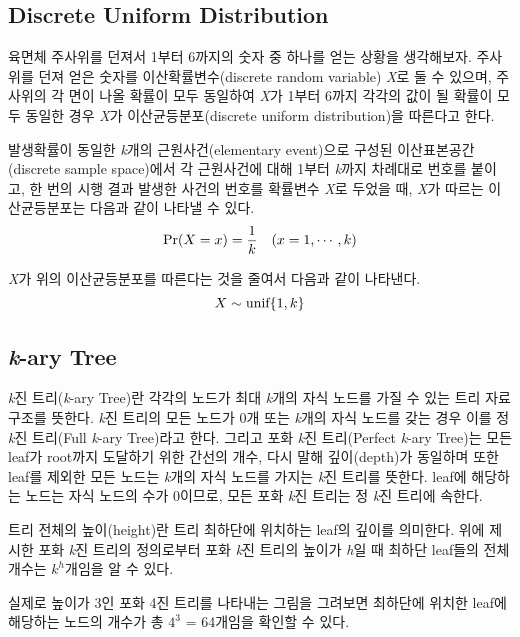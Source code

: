 \documentclass[11pt]{article}
\begin{document}
\subsection{Discrete Uniform Distribution}
육면체 주사위를 던져서 1부터 6까지의 숫자 중 하나를 얻는 상황을 생각해보자. 주사위를 던져 얻은 숫자를 이산확률변수(discrete random variable) \textit{X}로 둘 수 있으며, 주사위의 각 면이 나올 확률이 모두 동일하여 \textit{X}가 1부터 6까지 각각의 값이 될 확률이 모두 동일한 경우 \textit{X}가 이산균등분포(discrete uniform distribution)을 따른다고 한다.

발생확률이 동일한 \textit{k}개의 근원사건(elementary event)으로 구성된 이산표본공간(discrete sample space)에서 각 근원사건에 대해 1부터 \textit{k}까지 차례대로 번호를 붙이고, 한 번의 시행 결과 발생한 사건의 번호를 확률변수 \textit{X}로 두었을 때, \textit{X}가 따르는 이산균등분포는 다음과 같이 나타낼 수 있다.
\[\textnormal{Pr}(X = x) = \frac{1}{k} \quad(x = 1,\cdots, k)\]

\singlespacing \noindent \textit{X}가 위의 이산균등분포를 따른다는 것을 줄여서 다음과 같이 나타낸다.
\[X \sim \textnormal{unif}\{1, k\}\]

\doublespacing
\subsection{\textit{k}-ary Tree}
\textit{k}진 트리(\textit{k}-ary Tree)란 각각의 노드가 최대 \textit{k}개의 자식 노드를 가질 수 있는 트리 자료구조를 뜻한다. \textit{k}진 트리의 모든 노드가 0개 또는 \textit{k}개의 자식 노드를 갖는 경우 이를 정 \textit{k}진 트리(Full \textit{k}-ary Tree)라고 한다. 그리고 포화 \textit{k}진 트리(Perfect \textit{k}-ary Tree)는 모든 leaf가 root까지 도달하기 위한 간선의 개수, 다시 말해 깊이(depth)가 동일하며 또한 leaf를 제외한 모든 노드는 \textit{k}개의 자식 노드를 가지는 \textit{k}진 트리를 뜻한다. leaf에 해당하는 노드는 자식 노드의 수가 0이므로, 모든 포화 \textit{k}진 트리는 정 \textit{k}진 트리에 속한다.

트리 전체의 높이(height)란 트리 최하단에 위치하는 leaf의 깊이를 의미한다. 위에 제시한 포화 \textit{k}진 트리의 정의로부터 포화 \textit{k}진 트리의 높이가 \textit{h}일 때 최하단 leaf들의 전체 개수는 $k^h$개임을 알 수 있다.

실제로 높이가 3인 포화 4진 트리를 나타내는 그림을 그려보면 최하단에 위치한 leaf에 해당하는 노드의 개수가 총 $4^3$ = 64개임을 확인할 수 있다.
\\
\end{document}
